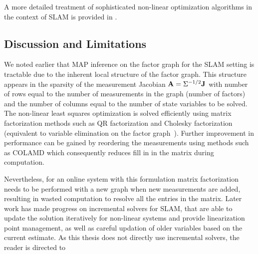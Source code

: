 A more detailed treatment of sophisticated non-linear optimization algorithms in the context of SLAM is provided in \cite{dellaertFactorGraphsRobot2017}.

\subsection{Discussion and Limitations}

We noted earlier that MAP inference on the factor graph for the SLAM setting is tractable due to the inherent local structure of the factor graph. This structure appears in the sparsity of the measurement Jacobian $\mathbf{A} = \Sigma^{-1/2} \mathbf{J}$ with number of rows equal to the number of measurements in the graph (number of factors) and the number of columns equal to the number of state variables to be solved. The non-linear least squares optimization is solved efficiently using matrix factorization methods such as QR factorization and Cholesky factorization (equivalent to variable elimination on the factor graph~\cite{dellaertSquareRootSAM2006}). Further improvement in performance can be gained by reordering the measurements using methods such as COLAMD \cite{davisAlgorithm8xxCOLAMD} which consequently reduces fill in in the matrix during computation.

Nevertheless, for an online system with this formulation matrix factorization needs to be performed with a new graph when new measurements are added, resulting in wasted computation to resolve all the entries in the matrix. Later work has made progress on incremental solvers for SLAM, that are able to update the solution iteratively for non-linear systems and provide linearization point management, as well as careful updation of older variables based on the current estimate. As this thesis does not directly use incremental solvers, the reader is directed to \citet{kaessISAM2IncrementalSmoothing2012}

